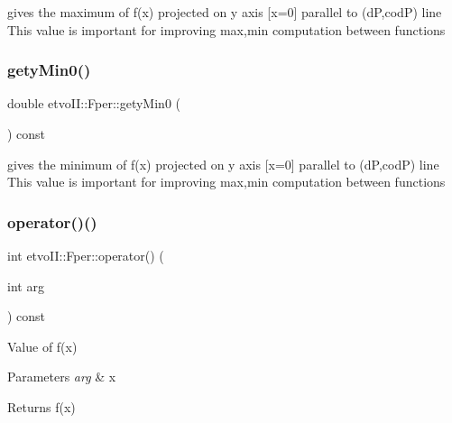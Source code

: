 gives the maximum of f(x) projected on y axis \mbox{[}x=0\mbox{]} parallel to (dP,codP) line This value is important for improving max,min computation between functions \mbox{\label{classetvo_i_i_1_1_fper_ad2a56b9c2325157a6f45ea9ceefe6256}} 
\subsubsection{\texorpdfstring{gety\+Min0()}{getyMin0()}}
{\footnotesize\ttfamily double etvo\+I\+I\+::\+Fper\+::gety\+Min0 (\begin{DoxyParamCaption}{ }\end{DoxyParamCaption}) const}

gives the minimum of f(x) projected on y axis \mbox{[}x=0\mbox{]} parallel to (dP,codP) line This value is important for improving max,min computation between functions \mbox{\label{classetvo_i_i_1_1_fper_a4d81e27d0d456a1ab086460363d0132f}} 
\subsubsection{\texorpdfstring{operator()()}{operator()()}}
{\footnotesize\ttfamily int etvo\+I\+I\+::\+Fper\+::operator() (\begin{DoxyParamCaption}\item[{int}]{arg }\end{DoxyParamCaption}) const}



Value of f(x) 


\begin{DoxyParams}{Parameters}
{\em arg} & x \\
\hline
\end{DoxyParams}
\begin{DoxyReturn}{Returns}
f(x) 
\end{DoxyReturn}
\mbox{\label{classetvo_i_i_1_1_fper_ad7664e69a14929469b201ef3511f0a32}} 
